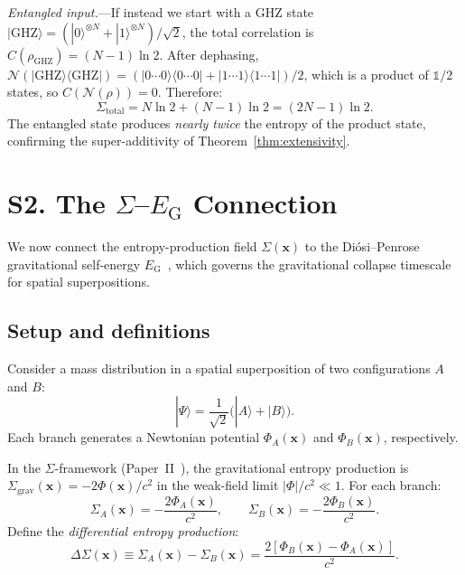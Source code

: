 \documentclass[letterpaper,twocolumn,superscriptaddress,longbibliography]{revtex4-2}
\newcommand{\chan}{\mathcal{N}}
\newcommand{\ket}[1]{|#1\rangle}
\newcommand{\bra}[1]{\langle#1|}
\newcommand{\op}[2]{|#1\rangle\langle#2|}
\newcommand{\Sgrav}{\Sigma_{\mathrm{grav}}}
\newcommand{\EG}{E_{\mathrm{G}}}
\newcommand{\DSigma}{\Delta\Sigma}
\begin{document}
\emph{Entangled input.}---If instead we start with a GHZ state
$\ket{\mathrm{GHZ}} = (\ket{0}^{\otimes N} +
\ket{1}^{\otimes N})/\sqrt{2}$, the total correlation is
$C(\rho_{\mathrm{GHZ}}) = (N-1)\ln 2$.
After dephasing, $\chan(\ket{\mathrm{GHZ}}\!\bra{\mathrm{GHZ}})
= (\op{0\cdots0}{0\cdots0} + \op{1\cdots1}{1\cdots1})/2$,
which is a product of $\mathbb{1}/2$ states, so
$C(\chan(\rho)) = 0$.
Therefore:
\begin{equation}
  \Sigma_{\mathrm{total}} = N \ln 2 + (N-1)\ln 2 = (2N-1)\ln 2.
  \label{eq:Sigma_GHZ}
\end{equation}
The entangled state produces \emph{nearly twice} the entropy of
the product state, confirming the super-additivity of
Theorem~\ref{thm:extensivity}.

\section{S2. The \texorpdfstring{$\Sigma$}{Sigma}--\texorpdfstring{$E_{\mathrm{G}}$}{E\_G} Connection}
\label{sec:Sigma_EG}

We now connect the entropy-production field $\Sigma(\bm{x})$
to the Di\'{o}si--Penrose gravitational self-energy
$\EG$~\cite{Diosi1987,Penrose1996}, which governs the
gravitational collapse timescale for spatial superpositions.

\subsection{Setup and definitions}

Consider a mass distribution in a spatial superposition of two
configurations $A$ and $B$:
\begin{equation}
  \ket{\Psi} = \frac{1}{\sqrt{2}}\bigl(\ket{A} + \ket{B}\bigr).
  \label{eq:superposition}
\end{equation}
Each branch generates a Newtonian potential
$\Phi_A(\bm{x})$ and $\Phi_B(\bm{x})$, respectively.

In the $\Sigma$-framework (Paper~II~\cite{PaperII}), the
gravitational entropy production is
$\Sgrav(\bm{x}) = -2\Phi(\bm{x})/c^2$
in the weak-field limit $|\Phi|/c^2 \ll 1$.
For each branch:
\begin{equation}
  \Sigma_A(\bm{x}) = -\frac{2\Phi_A(\bm{x})}{c^2}, \qquad
  \Sigma_B(\bm{x}) = -\frac{2\Phi_B(\bm{x})}{c^2}.
  \label{eq:Sigma_branches}
\end{equation}
Define the \emph{differential entropy production}:
\begin{equation}
  \DSigma(\bm{x})
  \equiv \Sigma_A(\bm{x}) - \Sigma_B(\bm{x})
  = \frac{2[\Phi_B(\bm{x}) - \Phi_A(\bm{x})]}{c^2}.
  \label{eq:DSigma_def}
\end{equation}
\end{document}

